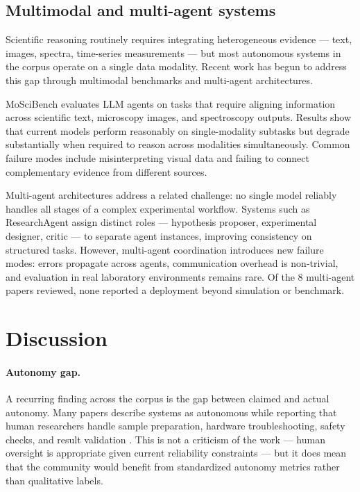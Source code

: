 \documentclass{article}
\begin{document}
\subsection{Multimodal and multi-agent systems}

Scientific reasoning routinely requires integrating heterogeneous evidence — text, images, spectra, time-series measurements — but most autonomous systems in the corpus operate on a single data modality. Recent work has begun to address this gap through multimodal benchmarks and multi-agent architectures.

MoSciBench \cite{he2024moscibench} evaluates LLM agents on tasks that require aligning information across scientific text, microscopy images, and spectroscopy outputs. Results show that current models perform reasonably on single-modality subtasks but degrade substantially when required to reason across modalities simultaneously. Common failure modes include misinterpreting visual data and failing to connect complementary evidence from different sources.

Multi-agent architectures address a related challenge: no single model reliably handles all stages of a complex experimental workflow. Systems such as ResearchAgent \cite{baek2024researchagent} assign distinct roles — hypothesis proposer, experimental designer, critic — to separate agent instances, improving consistency on structured tasks. However, multi-agent coordination introduces new failure modes: errors propagate across agents, communication overhead is non-trivial, and evaluation in real laboratory environments remains rare. Of the 8 multi-agent papers reviewed, none reported a deployment beyond simulation or benchmark.

\section{Discussion}
\label{sec:discussion}

\paragraph{Autonomy gap.}
A recurring finding across the corpus is the gap between claimed and actual autonomy. Many papers describe systems as autonomous while reporting that human researchers handle sample preparation, hardware troubleshooting, safety checks, and result validation \cite{burger2020mobile, carbonell2019automating, rozo2020learning}. This is not a criticism of the work — human oversight is appropriate given current reliability constraints — but it does mean that the community would benefit from standardized autonomy metrics rather than qualitative labels.
\end{document}
